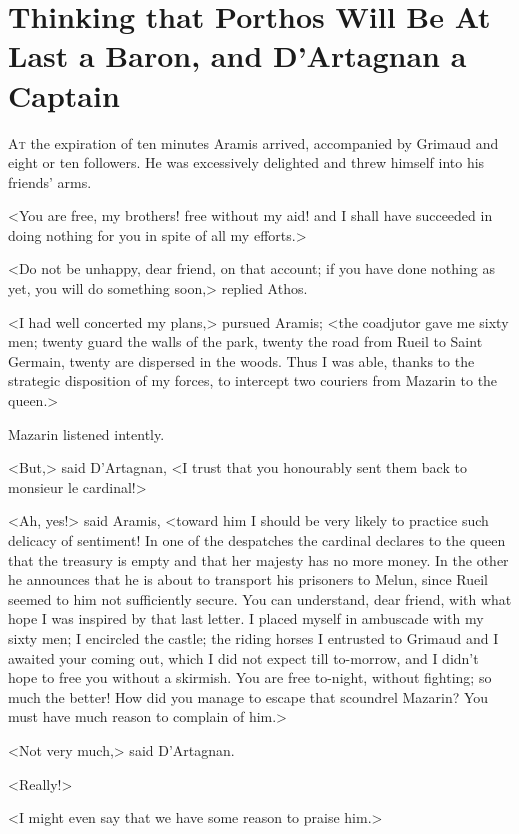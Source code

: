 \chapter[Porthos Will Be At Last a Baron]{Thinking that Porthos Will Be At Last a Baron, and D'Artagnan a Captain}
	


 \lettrine{A}{t} the expiration of ten minutes Aramis arrived, accompanied by Grimaud and eight or ten followers. He was excessively delighted and threw himself into his friends' arms.

\zz
<You are free, my brothers! free without my aid! and I shall have succeeded in doing nothing for you in spite of all my efforts.>

<Do not be unhappy, dear friend, on that account; if you have done nothing as yet, you will do something soon,> replied Athos.

<I had well concerted my plans,> pursued Aramis; <the coadjutor gave me sixty men; twenty guard the walls of the park, twenty the road from Rueil to Saint Germain, twenty are dispersed in the woods. Thus I was able, thanks to the strategic disposition of my forces, to intercept two couriers from Mazarin to the queen.>

Mazarin listened intently.

<But,> said D'Artagnan, <I trust that you honourably sent them back to monsieur le cardinal!>

<Ah, yes!> said Aramis, <toward him I should be very likely to practice such delicacy of sentiment! In one of the despatches the cardinal declares to the queen that the treasury is empty and that her majesty has no more money. In the other he announces that he is about to transport his prisoners to Melun, since Rueil seemed to him not sufficiently secure. You can understand, dear friend, with what hope I was inspired by that last letter. I placed myself in ambuscade with my sixty men; I encircled the castle; the riding horses I entrusted to Grimaud and I awaited your coming out, which I did not expect till to-morrow, and I didn't hope to free you without a skirmish. You are free to-night, without fighting; so much the better! How did you manage to escape that scoundrel Mazarin? You must have much reason to complain of him.>

<Not very much,> said D'Artagnan.

<Really!>

<I might even say that we have some reason to praise him.>


